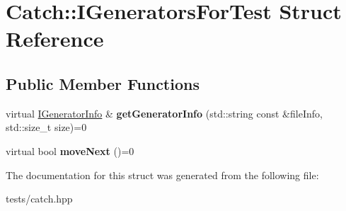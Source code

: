 \hypertarget{struct_catch_1_1_i_generators_for_test}{}\section{Catch\+:\+:I\+Generators\+For\+Test Struct Reference}
\label{struct_catch_1_1_i_generators_for_test}
\subsection*{Public Member Functions}
\begin{DoxyCompactItemize}
\item 
\mbox{\label{struct_catch_1_1_i_generators_for_test_a180d84e858840188e4c3788e47eefdb0}} 
virtual \hyperlink{struct_catch_1_1_i_generator_info}{I\+Generator\+Info} \& {\bfseries get\+Generator\+Info} (std\+::string const \&file\+Info, std\+::size\+\_\+t size)=0
\item 
\mbox{\label{struct_catch_1_1_i_generators_for_test_adab31832d529fc584fd63164e0a1c8ad}} 
virtual bool {\bfseries move\+Next} ()=0
\end{DoxyCompactItemize}


The documentation for this struct was generated from the following file\+:\begin{DoxyCompactItemize}
\item 
tests/catch.\+hpp\end{DoxyCompactItemize}

